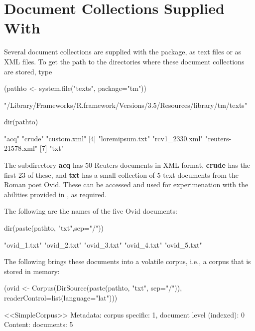 \section{Document Collections Supplied With }
Several document collections are supplied with the package,
as text files or as XML files.  To get the path to the
directories where these document collections are stored, type
\begin{fullwidth}

\begin{Schunk}
\begin{Sinput}
(pathto <- system.file("texts", package="tm"))
\end{Sinput}
\begin{Soutput}
[1] "/Library/Frameworks/R.framework/Versions/3.5/Resources/library/tm/texts"
\end{Soutput}
\begin{Sinput}
dir(pathto)
\end{Sinput}
\begin{Soutput}
[1] "acq"               "crude"             "custom.xml"       
[4] "loremipsum.txt"    "rcv1_2330.xml"     "reuters-21578.xml"
[7] "txt"              
\end{Soutput}
\end{Schunk}

\end{fullwidth}
The subdirectory \textbf{acq} has 50 Reuters documents in XML format,
\textbf{crude} has the first 23 of these, and \textbf{txt} has a
small collection of 5 text documents from the Roman poet Ovid.
These can be accessed and used for experimenation with the abilities
provided in , as required.

The following are the names of the five Ovid documents:
\begin{fullwidth}

\begin{Schunk}
\begin{Sinput}
dir(paste(pathto, "txt",sep="/"))
\end{Sinput}
\begin{Soutput}
[1] "ovid_1.txt" "ovid_2.txt" "ovid_3.txt" "ovid_4.txt" "ovid_5.txt"
\end{Soutput}
\end{Schunk}

\end{fullwidth}

The following brings these documents into a volatile corpus, i.e.,
a corpus that is stored in memory:
\begin{Schunk}
\begin{Sinput}
(ovid <-
   Corpus(DirSource(paste(pathto, "txt", sep="/")),
          readerControl=list(language="lat")))
\end{Sinput}
\begin{Soutput}
<<SimpleCorpus>>
Metadata:  corpus specific: 1, document level (indexed): 0
Content:  documents: 5
\end{Soutput}
\end{Schunk}

